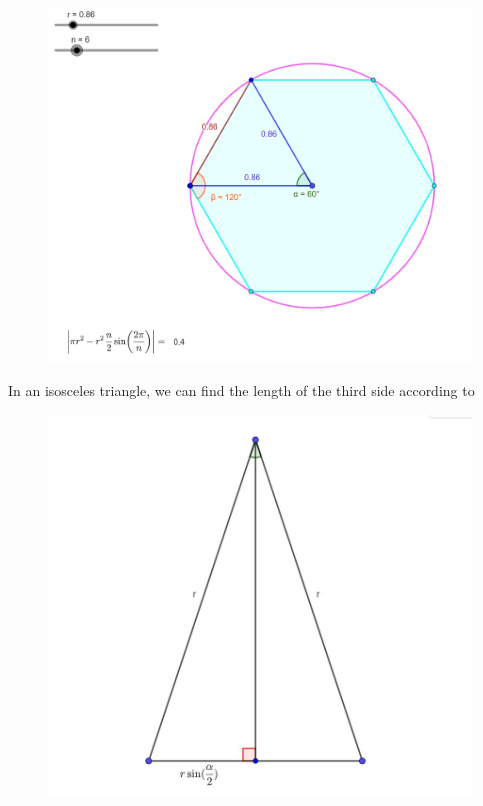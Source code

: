 \documentclass[11pt]{article}
\begin{document}
\begin{center}
	\begin{figure}[h]
		\includegraphics[scale=0.25]{circle_8.jpg}
	\end{figure}
\end{center}
In an isosceles triangle, we can find the length of the third side according to
\begin{center}
	\begin{figure}[h]
		\includegraphics[scale=0.5]{isos.jpg}
	\end{figure}
\end{center}
\end{document}
